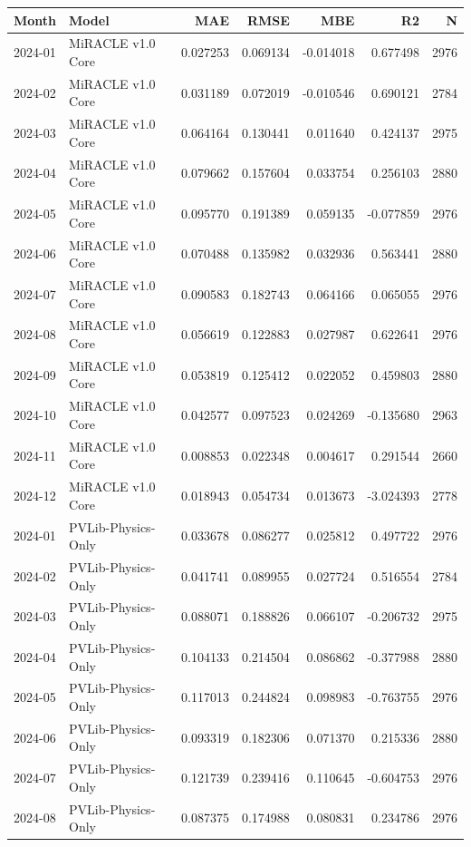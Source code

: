 \begin{tabular}{llrrrrr}
\toprule
Month & Model & MAE & RMSE & MBE & R2 & N \\
\midrule
2024-01 & MiRACLE v1.0 Core & 0.027253 & 0.069134 & -0.014018 & 0.677498 & 2976 \\
2024-02 & MiRACLE v1.0 Core & 0.031189 & 0.072019 & -0.010546 & 0.690121 & 2784 \\
2024-03 & MiRACLE v1.0 Core & 0.064164 & 0.130441 & 0.011640 & 0.424137 & 2975 \\
2024-04 & MiRACLE v1.0 Core & 0.079662 & 0.157604 & 0.033754 & 0.256103 & 2880 \\
2024-05 & MiRACLE v1.0 Core & 0.095770 & 0.191389 & 0.059135 & -0.077859 & 2976 \\
2024-06 & MiRACLE v1.0 Core & 0.070488 & 0.135982 & 0.032936 & 0.563441 & 2880 \\
2024-07 & MiRACLE v1.0 Core & 0.090583 & 0.182743 & 0.064166 & 0.065055 & 2976 \\
2024-08 & MiRACLE v1.0 Core & 0.056619 & 0.122883 & 0.027987 & 0.622641 & 2976 \\
2024-09 & MiRACLE v1.0 Core & 0.053819 & 0.125412 & 0.022052 & 0.459803 & 2880 \\
2024-10 & MiRACLE v1.0 Core & 0.042577 & 0.097523 & 0.024269 & -0.135680 & 2963 \\
2024-11 & MiRACLE v1.0 Core & 0.008853 & 0.022348 & 0.004617 & 0.291544 & 2660 \\
2024-12 & MiRACLE v1.0 Core & 0.018943 & 0.054734 & 0.013673 & -3.024393 & 2778 \\
2024-01 & PVLib-Physics-Only & 0.033678 & 0.086277 & 0.025812 & 0.497722 & 2976 \\
2024-02 & PVLib-Physics-Only & 0.041741 & 0.089955 & 0.027724 & 0.516554 & 2784 \\
2024-03 & PVLib-Physics-Only & 0.088071 & 0.188826 & 0.066107 & -0.206732 & 2975 \\
2024-04 & PVLib-Physics-Only & 0.104133 & 0.214504 & 0.086862 & -0.377988 & 2880 \\
2024-05 & PVLib-Physics-Only & 0.117013 & 0.244824 & 0.098983 & -0.763755 & 2976 \\
2024-06 & PVLib-Physics-Only & 0.093319 & 0.182306 & 0.071370 & 0.215336 & 2880 \\
2024-07 & PVLib-Physics-Only & 0.121739 & 0.239416 & 0.110645 & -0.604753 & 2976 \\
2024-08 & PVLib-Physics-Only & 0.087375 & 0.174988 & 0.080831 & 0.234786 & 2976 \\

\end{tabular}
